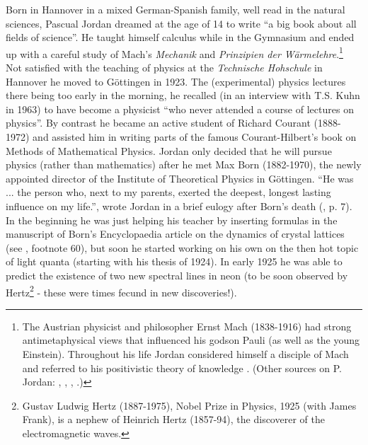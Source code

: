 \documentclass[12pt]{article}
\begin{document}
Born in Hannover in a mixed German-Spanish family, well read in the natural sciences,
Pascual Jordan dreamed at the age of 14 to write ``a big book about all fields of science''.
He taught himself calculus while in the Gymnasium and ended up with a careful study of Mach's
{\it Mechanik} and {\it Prinzipien der W\"armelehre}.\footnote{The Austrian physicist and philosopher Ernst Mach (1838-1916)
had strong antimetaphysical views that influenced his godson Pauli (as well as the young Einstein). Throughout his life 
Jordan considered himself a disciple of Mach and referred to his positivistic theory of knowledge \cite{Dar}. (Other
sources on P. Jordan: \cite{PJ07}, \cite{Sch99}, \cite{Me}, \cite{S06}.)} Not satisfied with the teaching of physics at the {\it
Technische Hohschule} in Hannover he moved to G\"ottingen in 1923. The (experimental) physics
lectures there being too early in the morning, he recalled (in an interview with
T.S. Kuhn in 1963) to have become a physicist ``who never attended a course of lectures on physics''.
By contrast he became an active student of Richard Courant (1888-1972) and assisted him in writing
parts of the famous Courant-Hilbert's book on Methods of Mathematical Physics. Jordan only decided
that he will pursue physics (rather than mathematics) after he met Max Born (1882-1970), the newly
appointed director of the Institute of Theoretical Physics in G\"ottingen. ``He was ... the
person who, next to my parents, exerted the deepest, longest lasting influence on my life.'',
wrote Jordan in a brief eulogy after Born's death (\cite {Sch}, p. 7). In the beginning he
was just helping his teacher by inserting formulas in the manuscript of Born's Encyclopaedia article on the dynamics of crystal lattices (see \cite{MR}, footnote 60), but soon he started working on his own on the then hot topic of light quanta (starting with his thesis of 1924).
In early 1925 he was able to predict the existence of two new spectral lines in neon (to be soon observed by Hertz\footnote{Gustav Ludwig 
Hertz (1887-1975), Nobel Prize in Physics, 1925 (with James Frank), is a nephew of Heinrich Hertz (1857-94), the discoverer of the
electromagnetic waves.} - these were times fecund in new discoveries!). 
\end{document}
